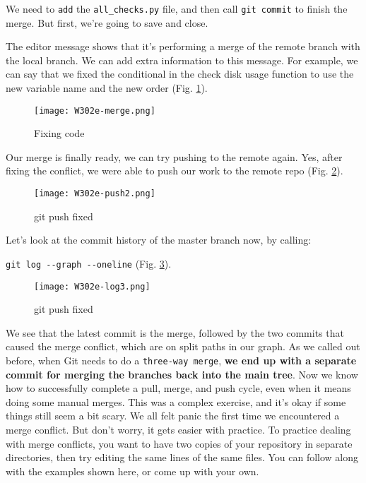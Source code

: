 We need to \verb|add| the \verb|all_checks.py| file, and then call \verb|git commit| to finish the merge. But first, we're going to save and close.

The editor message shows that it's performing a merge of the remote branch with the local branch. We can add extra information to this message. For example, we can say that we fixed the conditional in the check disk usage function to use the new variable name and the new order (Fig. \ref{W302e-merge}).

\begin{figure} 
	\caption{Fixing code}
	\centering
	\texttt{[image: W302e-merge.png]}
	\label{W302e-merge}
\end{figure}

Our merge is finally ready, we can try pushing to the remote again. Yes, after fixing the conflict, we were able to push our work to the remote repo (Fig. \ref{W302e-push2}). 

\begin{figure} 
	\caption{git push fixed}
	\centering
	\texttt{[image: W302e-push2.png]}
	\label{W302e-push2}
\end{figure}

Let's look at the commit history of the master branch now, by calling:

\verb|git log --graph --oneline| (Fig. \ref{W302e-log3}).

\begin{figure} 
	\caption{git push fixed}
	\centering
	\texttt{[image: W302e-log3.png]}
	\label{W302e-log3}
\end{figure}

We see that the latest commit is the merge, followed by the two commits that caused the merge conflict, which are on split paths in our graph. As we called out before, when Git needs to do a \verb|three-way merge|, \textbf{we end up with a separate commit for merging the branches back into the main tree}. Now we know how to successfully complete a pull, merge, and push cycle, even when it means doing some manual merges. This was a complex exercise, and it's okay if some things still seem a bit scary. We all felt panic the first time we encountered a merge conflict. But don't worry, it gets easier with practice. To practice dealing with merge conflicts, you want to have two copies of your repository in separate directories, then try editing the same lines of the same files. You can follow along with the examples shown here, or come up with your own.

